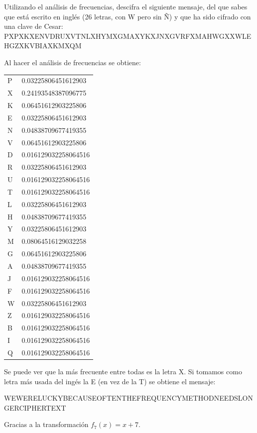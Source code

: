 \begin{problem}[3]
	Utilizando el análisis de frecuencias, descifra el siguiente mensaje, del que sabes que está escrito en inglés (26 letras, con W pero sin Ñ) y que ha sido cifrado con una clave de Cesar:
	PXPXKXENVDRUXVTNLXHYMXGMAXYKXJNXGVRFXMAHWGXXWLEHGZXKVBIAXKMXQM

	\solution

	Al hacer el análisis de frecuencias se obtiene:

	\begin{center}
		\begin{tabular}{ l l }
			P & 0.03225806451612903 \\
			X & 0.24193548387096775 \\
			K & 0.06451612903225806 \\
			E & 0.03225806451612903 \\
			N & 0.04838709677419355 \\
			V & 0.06451612903225806 \\
			D & 0.016129032258064516 \\
			R & 0.03225806451612903 \\
			U & 0.016129032258064516 \\
			T & 0.016129032258064516 \\
			L & 0.03225806451612903 \\
			H & 0.04838709677419355 \\
			Y & 0.03225806451612903 \\
			M & 0.08064516129032258 \\
			G & 0.06451612903225806 \\
			A & 0.04838709677419355 \\
			J & 0.016129032258064516 \\
			F & 0.016129032258064516 \\
			W & 0.03225806451612903 \\
			Z & 0.016129032258064516 \\
			B & 0.016129032258064516 \\
			I & 0.016129032258064516 \\
			Q & 0.016129032258064516
		\end{tabular}
	\end{center}

	Se puede ver que la más frecuente entre todas es la letra X. Si tomamos como letra más usada del ingés la E (en vez de la T) se obtiene el mensaje:

	WEWERELUCKYBECAUSEOFTENTHEFREQUENCYMETHODNEEDSLONGERCIPHERTEXT

	Gracias a la transformación $f_{7}(x) = x + 7$.
\end{problem}

